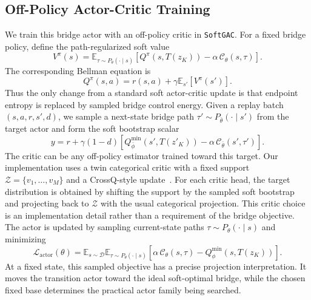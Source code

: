 \documentclass[11pt]{article}
\newcommand{\myalgo}{\texttt{SoftGAC}\xspace}
\begin{document}
\subsection{Off-Policy Actor-Critic Training}

We train this bridge actor with an off-policy critic in \myalgo. For a fixed bridge policy, define the path-regularized soft value
\begin{equation}
  V^\pi(s)
  =
  \mathbb E_{\tau\sim P_\theta(\cdot\mid s)}
  \left[
    Q^\pi(s,T(z_K))
    -
    \alpha\,\mathcal C_\theta(s,\tau)
  \right].
  \label{eq:soft_bridge_value}
\end{equation}
The corresponding Bellman equation is
\begin{equation}
  Q^\pi(s,a)
  =
  r(s,a)
  +
  \gamma
  \mathbb E_{s'}
  \left[
    V^\pi(s')
  \right].
  \label{eq:soft_bridge_bellman}
\end{equation}
Thus the only change from a standard soft actor-critic update is that endpoint entropy is replaced by sampled bridge control energy. Given a replay batch $(s,a,r,s',d)$, we sample a next-state bridge path $\tau'\sim P_{\bar\theta}(\cdot\mid s')$ from the target actor and form the soft bootstrap scalar
\begin{equation}
  y
  =
  r
  +
  \gamma(1-d)
  \left[
    Q_{\bar\phi}^{\min}(s',T(z'_K))
    -
    \alpha\,\mathcal C_{\bar\theta}(s',\tau')
  \right].
  \label{eq:soft_bridge_target}
\end{equation}
The critic can be any off-policy estimator trained toward this target. Our implementation uses a twin categorical critic with a fixed support $\mathcal Z=\{v_1,\ldots,v_M\}$ and a CrossQ-style update~\cite{bellemare2017distributional, bhatt2024crossq,DIME25}. For each critic head, the target distribution is obtained by shifting the support by the sampled soft bootstrap and projecting back to $\mathcal Z$ with the usual categorical projection. This critic choice is an implementation detail rather than a requirement of the bridge objective. The actor is updated by sampling current-state paths $\tau\sim P_\theta(\cdot\mid s)$ and minimizing
\begin{equation}
  \mathcal L_{\mathrm{actor}}(\theta)
  =
  \mathbb E_{s\sim\mathcal D}
  \mathbb E_{\tau\sim P_\theta(\cdot\mid s)}
  \left[
    \alpha\,\mathcal C_\theta(s,\tau)
    -
    Q_\phi^{\min}(s,T(z_K))
  \right].
  \label{eq:softgac_actor_loss}
\end{equation}
At a fixed state, this sampled objective has a precise projection interpretation. It moves the transition actor toward the ideal soft-optimal bridge, while the chosen fixed base determines the practical actor family being searched.
\end{document}
